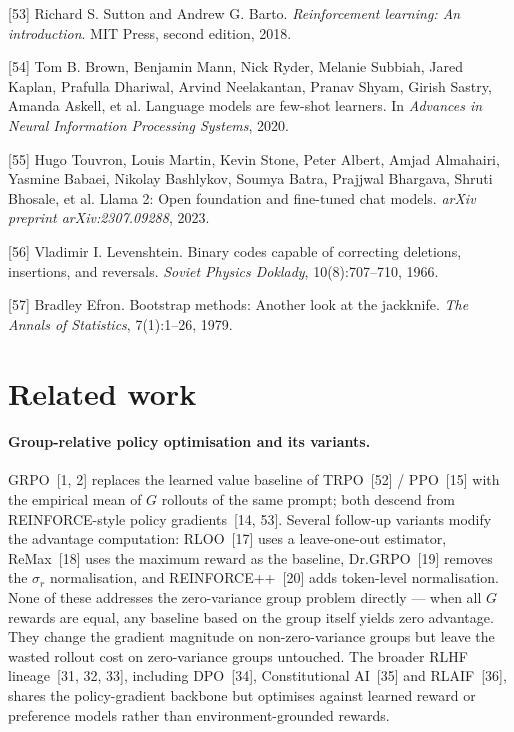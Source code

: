 \documentclass{article}
\begin{document}
[53] Richard S. Sutton and Andrew G. Barto. \textit{Reinforcement
learning: An introduction}. MIT Press, second edition, 2018.

[54] Tom B. Brown, Benjamin Mann, Nick Ryder, Melanie Subbiah,
Jared Kaplan, Prafulla Dhariwal, Arvind Neelakantan, Pranav Shyam,
Girish Sastry, Amanda Askell, et al. Language models are few-shot
learners. In \textit{Advances in Neural Information Processing
Systems}, 2020.

[55] Hugo Touvron, Louis Martin, Kevin Stone, Peter Albert,
Amjad Almahairi, Yasmine Babaei, Nikolay Bashlykov, Soumya Batra,
Prajjwal Bhargava, Shruti Bhosale, et al. Llama 2: Open
foundation and fine-tuned chat models.
\textit{arXiv preprint arXiv:2307.09288}, 2023.

[56] Vladimir I. Levenshtein. Binary codes capable of correcting
deletions, insertions, and reversals. \textit{Soviet Physics
Doklady}, 10(8):707--710, 1966.

[57] Bradley Efron. Bootstrap methods: Another look at the
jackknife. \textit{The Annals of Statistics}, 7(1):1--26, 1979.

\endgroup


\appendix
\newpage

\section{Related work}
\label{app:related_extended}

\paragraph{Group-relative policy optimisation and its variants.}
GRPO~[1, 2] replaces the learned value baseline of TRPO~[52] /
PPO~[15] with the empirical mean of $G$ rollouts of the same
prompt; both descend from REINFORCE-style policy
gradients~[14, 53]. Several follow-up variants modify the
advantage computation:
RLOO~[17] uses a leave-one-out estimator, ReMax~[18] uses the
maximum reward as the baseline, Dr.GRPO~[19] removes the
$\sigma_r$ normalisation, and REINFORCE++~[20] adds token-level
normalisation. None of these addresses the zero-variance group
problem directly --- when all $G$ rewards are equal, any baseline
based on the group itself yields zero advantage. They change the
gradient magnitude on non-zero-variance groups but leave the
wasted rollout cost on zero-variance groups untouched. The
broader RLHF lineage~[31, 32, 33], including DPO~[34],
Constitutional AI~[35] and RLAIF~[36], shares the policy-gradient
backbone but optimises against learned reward or preference
models rather than environment-grounded rewards.
\end{document}
